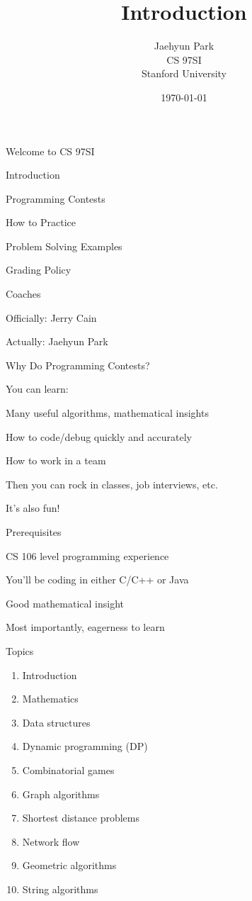\documentclass[13pt,onlymath]{beamer}
\title{\large \bfseries Introduction}
\author{Jaehyun Park\\[3ex]
CS 97SI\\
Stanford University}
\date{\today}
\begin{document}
\frame{
\thispagestyle{empty}
\titlepage
}

\begin{frame}{Welcome to CS 97SI}
\BIT
\item Introduction
\item Programming Contests
\item How to Practice
\item Problem Solving Examples
\item Grading Policy
\EIT
\end{frame}

\begin{frame}{Coaches}
\BIT
\item Officially: Jerry Cain
\item Actually: Jaehyun Park
\EIT
\end{frame}

\begin{frame}{Why Do Programming Contests?}
\BIT
\item You can learn:
\BIT
\item Many useful algorithms, mathematical insights
\item How to code/debug quickly and accurately
\item How to work in a team
\EIT
\item Then you can rock in classes, job interviews, etc.
\item It's also fun!
\EIT
\end{frame}

\begin{frame}{Prerequisites}
\BIT
\item CS 106 level programming experience
\BIT
\item You'll be coding in either C/C++ or Java
\EIT
\item Good mathematical insight

\item Most importantly, eagerness to learn
\EIT
\end{frame}

\begin{frame}{Topics}
\begin{enumerate}
\item Introduction
\item Mathematics
\item Data structures
\item Dynamic programming (DP)
\item Combinatorial games
\item Graph algorithms
\item Shortest distance problems
\item Network flow
\item Geometric algorithms
\item String algorithms
\end{enumerate}
\end{frame}
\end{document}
